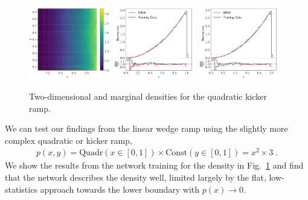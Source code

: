 \begin{figure}[b!]
\centering
\includegraphics[width=0.32\textwidth, page=1]{./figures/bINN/quadratic_2dhists}
\includegraphics[width=0.32\textwidth, page=1]{./figures/bINN/quadratic_1dhists}
\includegraphics[width=0.32\textwidth, page=2]{./figures/bINN//quadratic_1dhists}
\caption{Two-dimensional and marginal densities for the quadratic
  kicker ramp.}
\label{fig:quadratic_hists}
\end{figure}

We can test our findings from the linear wedge ramp using the slightly
more complex quadratic or kicker ramp,
%
\begin{align}
  p(x, y) =  \text{Quadr} (x\in[0,1]) \times \text{Const} (y \in[0, 1])
  = x^2 \times 3 \; .
\label{eq:quadratic_dens}
\end{align}
%
We show the results from the network training for the density in
Fig.~\ref{fig:quadratic_hists} and find that the network describes the
density well, limited largely by the flat, low-statistics approach
towards the lower boundary with $p(x) \to 0$.

